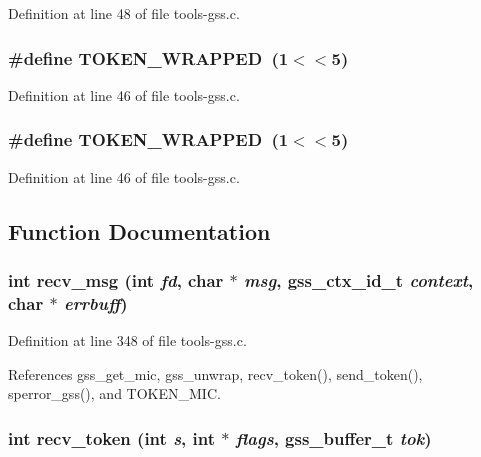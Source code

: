 Definition at line 48 of file tools-gss.c.
\subsubsection{\setlength{\rightskip}{0pt plus 5cm}\#define TOKEN\_\-WRAPPED\ (1$<$$<$5)}\label{tools-gss_8c_a18}




Definition at line 46 of file tools-gss.c.
\subsubsection{\setlength{\rightskip}{0pt plus 5cm}\#define TOKEN\_\-WRAPPED\ (1$<$$<$5)}\label{tools-gss_8c_a10}




Definition at line 46 of file tools-gss.c.

\subsection{Function Documentation}
\subsubsection{\setlength{\rightskip}{0pt plus 5cm}int recv\_\-msg (int {\em fd}, char $\ast$ {\em msg}, gss\_\-ctx\_\-id\_\-t {\em context}, char $\ast$ {\em errbuff})}\label{tools-gss_8c_a29}




Definition at line 348 of file tools-gss.c.

References gss\_\-get\_\-mic, gss\_\-unwrap, recv\_\-token(), send\_\-token(), sperror\_\-gss(), and TOKEN\_\-MIC.
\subsubsection{\setlength{\rightskip}{0pt plus 5cm}int recv\_\-token (int {\em s}, int $\ast$ {\em flags}, gss\_\-buffer\_\-t {\em tok})}\label{tools-gss_8c_a27}




